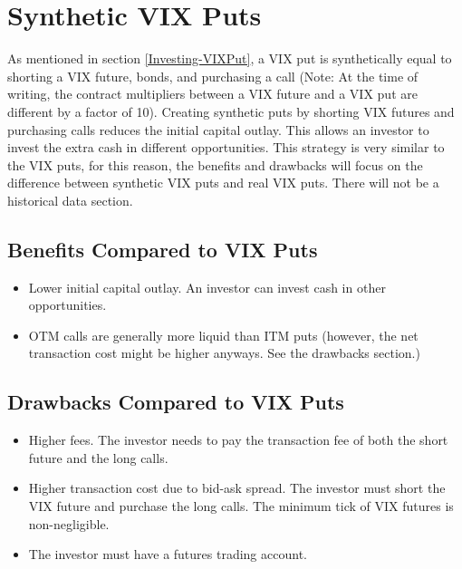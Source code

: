 \documentclass[11pt, oneside]{book}
\begin{document}
\section{Synthetic VIX Puts} \label{Investing-SyntheticPut}
As mentioned in section \ref{Investing-VIXPut}, a VIX put is synthetically equal to shorting a VIX future, bonds, and purchasing a call (Note: At the time of writing, the contract multipliers between a VIX future and a VIX put are different by a factor of 10). Creating synthetic puts by shorting VIX futures and purchasing calls reduces the initial capital outlay. This allows an investor to invest the extra cash in different opportunities. This strategy is very similar to the VIX puts, for this reason, the benefits and drawbacks will focus on the difference between synthetic VIX puts and real VIX puts. There will not be a historical data section.

\subsection{Benefits Compared to VIX Puts} \label{Investing-SyntheticPut-Benefit}
\begin{itemize}
    \item Lower initial capital outlay. An investor can invest cash in other opportunities.
    \item OTM calls are generally more liquid than ITM puts (however, the net transaction cost might be higher anyways. See the drawbacks section.)
\end{itemize}

\subsection{Drawbacks Compared to VIX Puts} \label{Investing-SyntheticPut-Drawbacks}
\begin{itemize}
    \item Higher fees. The investor needs to pay the transaction fee of both the short future and the long calls.
    \item Higher transaction cost due to bid-ask spread. The investor must short the VIX future and purchase the long calls. The minimum tick of VIX futures is non-negligible.
    \item The investor must have a futures trading account.
\end{itemize}
\end{document}
